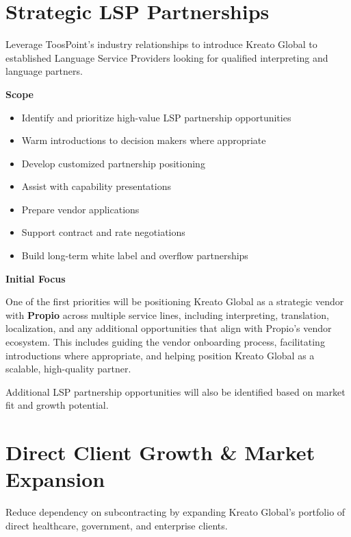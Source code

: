 \documentclass{toospoint}
\begin{document}
\section{Strategic LSP Partnerships}

Leverage ToosPoint's industry relationships to introduce Kreato Global to
established Language Service Providers looking for qualified interpreting and
language partners.

\vspace{4pt}
\noindent\textbf{\color{TPDark}Scope}
\begin{itemize}[leftmargin=1.5em, itemsep=2pt, topsep=2pt]
  \item Identify and prioritize high-value LSP partnership opportunities
  \item Warm introductions to decision makers where appropriate
  \item Develop customized partnership positioning
  \item Assist with capability presentations
  \item Prepare vendor applications
  \item Support contract and rate negotiations
  \item Build long-term white label and overflow partnerships
\end{itemize}

\vspace{4pt}
\noindent\textbf{\color{TPDark}Initial Focus}

One of the first priorities will be positioning Kreato Global as a strategic
vendor with \textbf{Propio} across multiple service lines, including
interpreting, translation, localization, and any additional opportunities
that align with Propio's vendor ecosystem. This includes guiding the vendor
onboarding process, facilitating introductions where appropriate, and helping
position Kreato Global as a scalable, high-quality partner.

Additional LSP partnership opportunities will also be identified based on
market fit and growth potential.

\section{Direct Client Growth \& Market Expansion}

Reduce dependency on subcontracting by expanding Kreato Global's portfolio of
direct healthcare, government, and enterprise clients.
\end{document}
